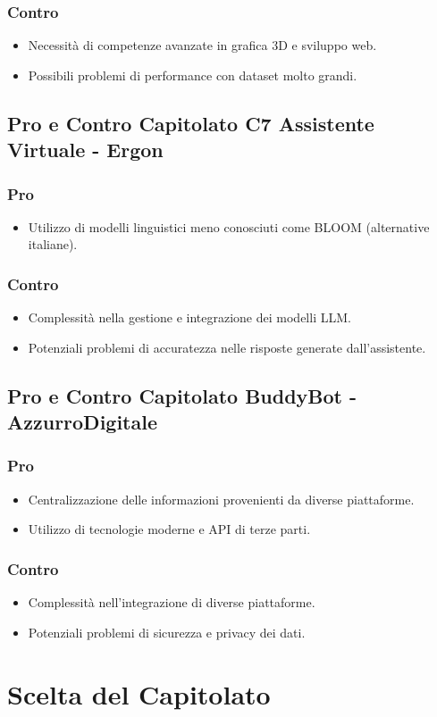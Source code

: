 \documentclass{article}
\begin{document}
\subsubsection{Contro}
\begin{itemize}
    \item Necessità di competenze avanzate in grafica 3D e sviluppo web.
    \item Possibili problemi di performance con dataset molto grandi.
\end{itemize}

\subsection{Pro e Contro Capitolato C7 Assistente Virtuale - Ergon}

\subsubsection{Pro}
\begin{itemize}
    \item Utilizzo di modelli linguistici meno conosciuti come BLOOM (alternative italiane).
\end{itemize}

\subsubsection{Contro}
\begin{itemize}
    \item Complessità nella gestione e integrazione dei modelli LLM.
    \item Potenziali problemi di accuratezza nelle risposte generate dall'assistente.
\end{itemize}

\subsection{Pro e Contro Capitolato BuddyBot - AzzurroDigitale}

\subsubsection{Pro}
\begin{itemize}
    \item Centralizzazione delle informazioni provenienti da diverse piattaforme.
    \item Utilizzo di tecnologie moderne e API di terze parti.
\end{itemize}

\subsubsection{Contro}
\begin{itemize}
    \item Complessità nell'integrazione di diverse piattaforme.
    \item Potenziali problemi di sicurezza e privacy dei dati.
\end{itemize}

\section{Scelta del Capitolato}
\end{document}
